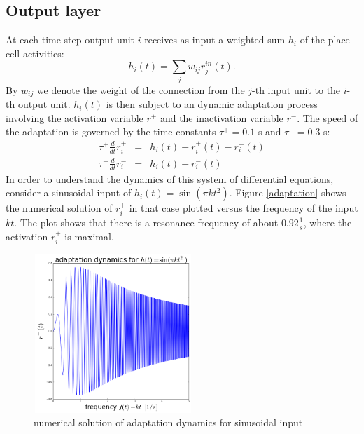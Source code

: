 \documentclass[a4paper, 12pt]{article}
\begin{document}
\subsection{Output layer}
At each time step output unit $i$ receives as input a weighted sum $h_i$ of the place cell activities: 
	\begin{equation}
	h_i(t)=\sum_jw_{ij}r_j^{in}(t).
	\end{equation}
By $w_{ij}$ we denote the weight of the connection from the $j$-th input unit to the $i$-th output unit. $h_i(t)$ is then subject to an dynamic adaptation process involving the activation variable $r^+$ and the inactivation variable $r^-$. The speed of the adaptation is governed by the time constants $\tau^+=0.1$ s and $\tau^-=0.3$ s:
	\begin{eqnarray}
	\tau^+\frac{d}{dt}r^+_i &=& h_i(t)-r^+_i(t)-r^-_i(t)\\
	\tau^-\frac{d}{dt}r^-_i &=& h_i(t)-r^-_i(t)
	\end{eqnarray}
In order to understand the dynamics of this system of differential equations, consider a sinusoidal input of $h_i(t) = \sin(\pi k t^2)$. Figure \ref{adaptation} shows the numerical solution of $r^+_i$ in that case plotted versus the frequency of the input $kt$. The plot shows that there is a resonance frequency of about $0.92 \frac{1}{s}$, where the activation $r^+_i$ is maximal.
\begin{figure}[h]
	\begin{center}
	\includegraphics[width=6cm, height=6cm]{pics/sinusoidal_activation}
	\footnotesize{\caption{numerical solution of adaptation dynamics for sinusoidal input}}
	\end{center}
\end{figure}
\end{document}
